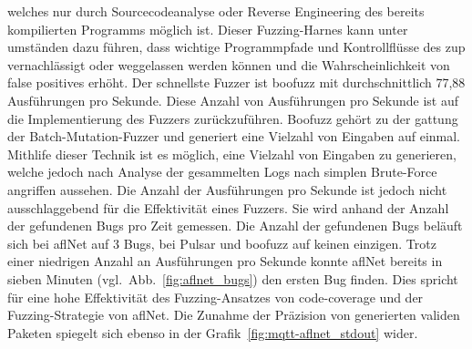 welches nur durch Sourcecodeanalyse oder Reverse Engineering des bereits kompilierten Programms möglich ist.
Dieser Fuzzing-Harnes kann unter umständen dazu führen, dass wichtige Programmpfade und Kontrollflüsse des \gls{zup}
vernachlässigt oder weggelassen werden können und die Wahrscheinlichkeit von false positives erhöht.\newline
Der schnellste Fuzzer ist boofuzz mit durchschnittlich 77,88 Ausführungen pro Sekunde.
Diese Anzahl von Ausführungen pro Sekunde ist auf die Implementierung des Fuzzers zurückzuführen.
Boofuzz gehört zu der gattung der Batch-Mutation-Fuzzer und generiert eine Vielzahl von Eingaben auf einmal.
Mithlife dieser Technik ist es möglich, eine Vielzahl von Eingaben zu generieren, welche jedoch nach Analyse der gesammelten
Logs nach simplen Brute-Force angriffen aussehen.\newline\newline
Die Anzahl der Ausführungen pro Sekunde ist jedoch nicht ausschlaggebend für die Effektivität eines Fuzzers.
Sie wird anhand der Anzahl der gefundenen Bugs pro Zeit gemessen.
Die Anzahl der gefundenen Bugs beläuft sich bei \gls{afl}Net auf 3 Bugs, bei Pulsar und boofuzz auf keinen einzigen.
Trotz einer niedrigen Anzahl an Ausführungen pro Sekunde konnte \gls{afl}Net bereits in sieben Minuten (vgl.\ Abb.~\ref{fig:aflnet_bugs})
den ersten Bug finden.
Dies spricht für eine hohe Effektivität des Fuzzing-Ansatzes von code-coverage und der Fuzzing-Strategie von \gls{afl}Net.
Die Zunahme der Präzision von generierten validen Paketen spiegelt sich ebenso in der Grafik~\ref{fig:mqtt-aflnet_stdout}
wider.